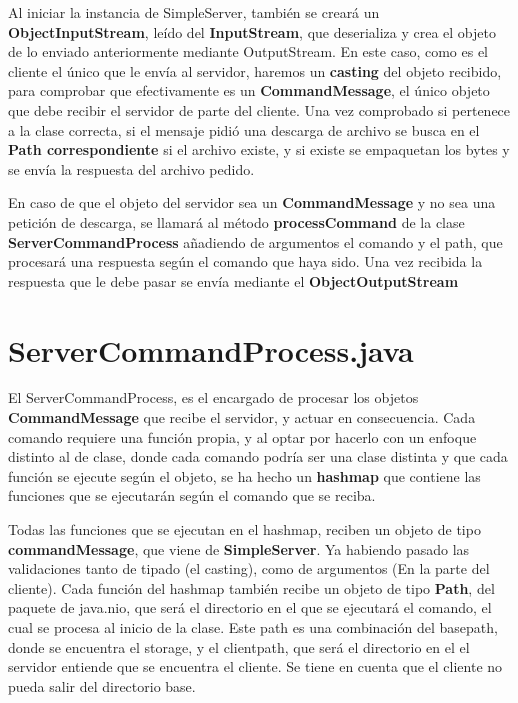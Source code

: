 \documentclass[a4paper, 12pt]{report}
\begin{document}
Al iniciar la instancia de SimpleServer, también se creará un \textbf{ObjectInputStream}, leído del \textbf{InputStream}, que deserializa y crea el objeto de lo enviado anteriormente mediante OutputStream.
En este caso, como es el cliente el único que le envía al servidor, haremos un \textbf{casting} del objeto recibido, para comprobar que efectivamente es un \textbf{CommandMessage}, el único objeto que debe recibir el servidor de parte del cliente. Una vez comprobado si pertenece a la clase correcta, si el mensaje pidió una descarga de archivo se busca en el \textbf{Path correspondiente} si el archivo existe, y si existe se empaquetan los bytes y se envía la respuesta del archivo pedido.

En caso de que el objeto del servidor sea un \textbf{CommandMessage} y no sea una petición de descarga, se llamará al método \textbf{processCommand} de la clase \textbf{ServerCommandProcess} añadiendo de argumentos el comando y el path, que procesará una respuesta según el comando que haya sido. Una vez recibida la respuesta que le debe pasar se envía mediante el \textbf{ObjectOutputStream}

\section{ServerCommandProcess.java}

El ServerCommandProcess, es el encargado de procesar los objetos \textbf{CommandMessage} que recibe el
servidor, y actuar en consecuencia. Cada comando requiere una función propia, y al optar
por hacerlo con un enfoque distinto al de clase, donde cada comando podría ser una clase distinta y que cada
función se ejecute según el objeto, se ha hecho un \textbf{hashmap} que contiene las funciones que se ejecutarán
según el comando que se reciba.

Todas las funciones que se ejecutan en el hashmap, reciben un objeto de tipo \textbf{commandMessage},
que viene de \textbf{SimpleServer}. Ya habiendo pasado las validaciones tanto de tipado (el casting),
como de argumentos (En la parte del cliente). Cada función del hashmap también recibe un objeto de tipo
\textbf{Path}, del paquete de java.nio, que será el directorio en el que se ejecutará el comando, el cual se
procesa al inicio de la clase. Este path es una combinación del basepath, donde se encuentra el storage, y el
clientpath, que será el directorio en el el servidor entiende que se encuentra el cliente.
Se tiene en cuenta que el cliente no pueda salir del directorio base.
\end{document}
